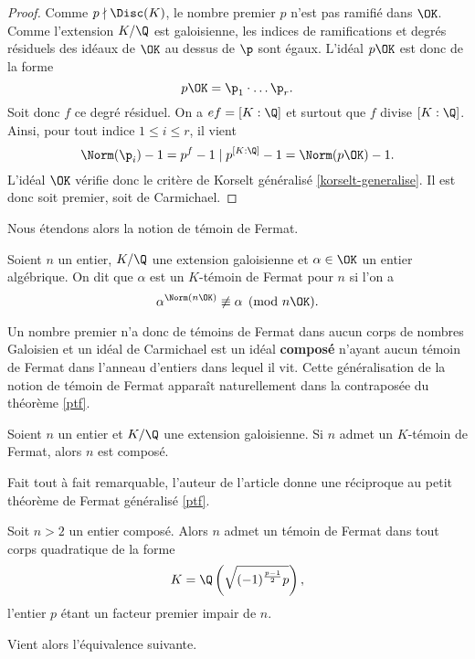 \begin{proof}
	Comme $p\nmid \Disc(K)$, le nombre premier $p$ n'est pas ramifié dans $\OK$. Comme l'extension $K/\Q$ est galoisienne, les indices de ramifications et degrés résiduels des idéaux de $\OK$ au dessus de $\p$ sont égaux. L'idéal $p\OK$ est donc de la forme \[p\OK = \p_1\cdot \dots \p_r.\] Soit donc $f$ ce degré résiduel. On a $ef = [K : \Q]$ et surtout que $f$ divise $[ K : \Q ]$. Ainsi, pour tout indice $1\leq i \leq r$, il vient \[ \Norm(\p_i) - 1 = p^f - 1 \mid p^{[K : \Q]} - 1 = \Norm(p\OK) - 1.\] L'idéal $\OK$ vérifie donc le critère de Korselt généralisé \ref{korselt-generalise}. Il est donc soit premier, soit de Carmichael.
\end{proof}

Nous étendons alors la notion de témoin de Fermat.

\begin{definition}
	Soient $n$ un entier, $K/\Q$ une extension galoisienne et $\alpha\in \OK$ un entier algébrique. On dit que $\alpha$ est un $K$-témoin de Fermat pour $n$ si l'on a \[\alpha^{\Norm(n\OK)} \not \equiv \alpha \pmod{n\OK}.\]
\end{definition}

Un nombre premier n'a donc de témoins de Fermat dans aucun corps de nombres Galoisien et un idéal de Carmichael est un idéal \textbf{composé} n'ayant aucun témoin de Fermat dans l'anneau d'entiers dans lequel il vit. Cette généralisation de la notion de témoin de Fermat apparaît naturellement dans la contraposée du théorème \ref{ptf}.

\begin{theoreme}\label{ptf-contraposee}
	Soient $n$ un entier et $K/\Q$ une extension galoisienne. Si $n$ admet un $K$-témoin de Fermat, alors $n$ est composé.
\end{theoreme}

Fait tout à fait remarquable, l'auteur de l'article donne une réciproque au petit théorème de Fermat généralisé \ref{ptf}.

\begin{theoreme}
	Soit $n>2$ un entier composé. Alors $n$ admet un témoin de Fermat dans tout corps quadratique de la forme \[K = \Q\left(\sqrt{(-1)^{\frac{p-1}{2}}p}\right),\] l'entier $p$ étant un facteur premier impair de $n$.
\end{theoreme}

Vient alors l'équivalence suivante.

